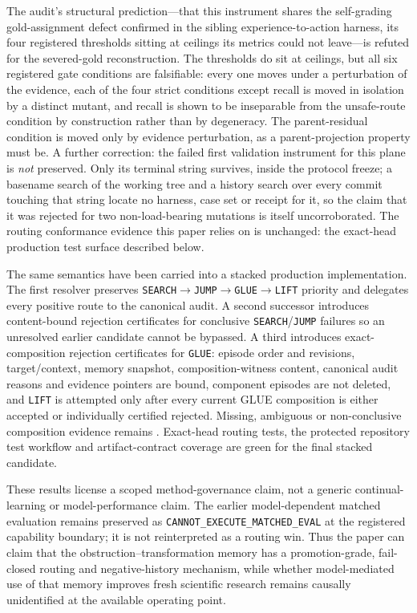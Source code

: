 The audit's structural prediction---that this instrument shares the self-grading gold-assignment defect confirmed in the sibling experience-to-action harness, its four registered thresholds sitting at ceilings its metrics could not leave---is refuted for the severed-gold reconstruction.  The thresholds do sit at ceilings, but all six registered gate conditions are falsifiable: every one moves under a perturbation of the evidence, each of the four strict conditions except \CANNOTCHECK{} recall is moved in isolation by a distinct mutant, and \CANNOTCHECK{} recall is shown to be inseparable from the unsafe-route condition by construction rather than by degeneracy.  The parent-residual condition is moved only by evidence perturbation, as a parent-projection property must be.  A further correction: the failed first validation instrument for this plane is \emph{not} preserved.  Only its terminal string survives, inside the protocol freeze; a basename search of the working tree and a history search over every commit touching that string locate no harness, case set or receipt for it, so the claim that it was rejected for two non-load-bearing mutations is itself uncorroborated.  The routing conformance evidence this paper relies on is unchanged: the exact-head production test surface described below.

The same semantics have been carried into a stacked production implementation.  The first resolver preserves \texttt{SEARCH}$\rightarrow$\texttt{JUMP}$\rightarrow$\texttt{GLUE}$\rightarrow$\texttt{LIFT} priority and delegates every positive route to the canonical audit.  A second successor introduces content-bound rejection certificates for conclusive \texttt{SEARCH}/\texttt{JUMP} failures so an unresolved earlier candidate cannot be bypassed.  A third introduces exact-composition rejection certificates for \texttt{GLUE}: episode order and revisions, target/context, memory snapshot, composition-witness content, canonical audit reasons and evidence pointers are bound, component episodes are not deleted, and \texttt{LIFT} is attempted only after every current GLUE composition is either accepted or individually certified rejected.  Missing, ambiguous or non-conclusive composition evidence remains \CANNOTCHECK{}.  Exact-head routing tests, the protected repository test workflow and artifact-contract coverage are green for the final stacked candidate.

These results license a scoped method-governance claim, not a generic continual-learning or model-performance claim.  The earlier model-dependent matched evaluation remains preserved as \texttt{CANNOT\_EXECUTE\_MATCHED\_EVAL} at the registered capability boundary; it is not reinterpreted as a routing win.  Thus the paper can claim that the obstruction--transformation memory has a promotion-grade, fail-closed routing and negative-history mechanism, while whether model-mediated use of that memory improves fresh scientific research remains causally unidentified at the available operating point.
